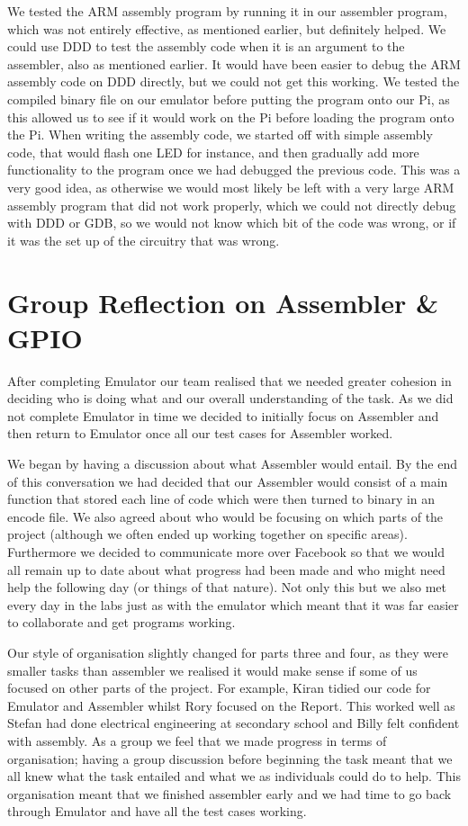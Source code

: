 \documentclass[a4wide, 10pt]{article}
\begin{document}
We tested the ARM assembly program by running it in our assembler program, which was not entirely effective, as mentioned earlier, but definitely helped. We could use DDD to test the assembly code when it is an argument to the assembler, also as mentioned earlier. It would have been easier to debug the ARM assembly code on DDD directly, but we could not get this working. We tested the compiled binary file on our emulator before putting the program onto our Pi, as this allowed us to see if it would work on the Pi before loading the program onto the Pi. When writing the assembly code, we started off with simple assembly code, that would flash one LED for instance, and then gradually add more functionality to the program once we had debugged the previous code. This was a very good idea, as otherwise we would most likely be left with a very large ARM assembly program that did not work properly, which we could not directly debug with DDD or GDB, so we would not know which bit of the code was wrong, or if it was the set up of the circuitry that was wrong.

\section*{Group Reflection on Assembler \& GPIO}

After completing Emulator our team realised that we needed greater cohesion in deciding who is doing what and our overall understanding of the task. As we did not complete Emulator in time we decided to initially focus on Assembler and then return to Emulator once all our test cases for Assembler worked.

We began by having a discussion about what Assembler would entail. By the end of this conversation we had decided that our Assembler would consist of a main function that stored each line of code which were then turned to binary in an encode file. We also agreed about who would be focusing on which parts of the project (although we often ended up working together on specific areas). Furthermore we decided to communicate more over Facebook so that we would all remain up to date about what progress had been made and who might need help the following day (or things of that nature). Not only this but we also met every day in the labs just as with the emulator which meant that it was far easier to collaborate and get programs working.

Our style of organisation slightly changed for parts three and four, as they were smaller tasks than assembler we realised it would make sense if some of us focused on other parts of the project. For example, Kiran tidied our code for Emulator and Assembler whilst Rory focused on the Report. This worked well as Stefan had done electrical engineering at secondary school and Billy felt confident with assembly. As a group we feel that we made progress in terms of organisation; having a group discussion before beginning the task meant that we all knew what the task entailed and what we as individuals could do to help. This organisation meant that we finished assembler early and we had time to go back through Emulator and have all the test cases working.
\end{document}
